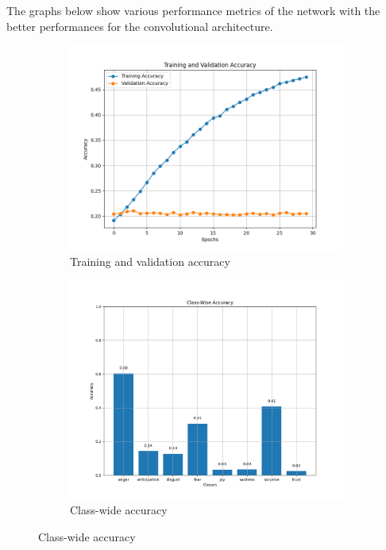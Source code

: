 The graphs below show various performance metrics of the network with the better
performances for the convolutional architecture.
\begin{figure}[H]
    \centering
    \begin{subfigure}{0.48\textwidth}
        \includegraphics[width=\textwidth]{pictures/cnn_accuracy.png}
        \caption{Training and validation accuracy}
        \label{fig:cnn_train_val_acc}
    \end{subfigure}
    \begin{subfigure}{0.5\textwidth}
        \includegraphics[width=\textwidth]{pictures/cnn_class_accuracy.png}
        \caption{Class-wide accuracy}

\end{subfigure}
\end{figure}
